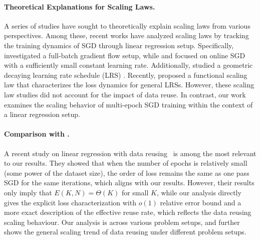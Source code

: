 \paragraph{Theoretical Explanations for Scaling Laws.} A series of studies \citep{sharma2020neuralscalinglawdimension,hutter2021learning,maloney2022solvable,wei2022more,jain2024scalinglawslearningreal,michaud2024quantization,nam2024exactly,atanasov2024scaling,dohmatob2024tale,bahri2024explaining,bordelon2024dynamical,lin2024scaling,paquette202543phasescomputeoptimalneural,bordelon2024feature,zhang2024does,ferbach2025dimension,li2025fsl} have sought to theoretically explain scaling laws from various perspectives. Among these, recent works \citep{bordelon2024dynamical,paquette202543phasescomputeoptimalneural,lin2024scaling,bordelon2024feature} have analyzed scaling laws by tracking the training dynamics of SGD through linear regression setup. Specifically, \citet{bordelon2024dynamical} investigated a full-batch gradient flow setup, while \citet{paquette202543phasescomputeoptimalneural} and \citet{bordelon2024feature} focused on online SGD with a sufficiently small constant learning rate. Additionally, \citet{lin2024scaling} studied a geometric decaying learning rate schedule (LRS) \citep{ge2019step,wu2022iterateriskboundssgd}. Recently, \citet{li2025fsl} proposed a functional scaling law that characterizes the loss dynamics for general LRSs. However, these scaling law studies did not account for the impact of data reuse. In contrast, our work examines the scaling behavior of multi-epoch SGD training within the context of a linear regression setup. 

\paragraph{Comparison with \citet{lin2025improved}.} A recent study on linear regression with data reusing~\citep{lin2025improved} is among the most relevant to our results. They showed that when the number of epochs is relatively small (some power of the dataset size), the order of loss remains the same as one pass SGD for the same iterations, which aligns with our results. However, their results only imply that $E(K,N) = \Theta(K)$ for small $K$, while our analysis directly gives the explicit loss characterization with $o(1)$ relative error bound and a more exact description of the effective reuse rate, which reflects the data reusing scaling behaviour. Our analysis is across various problem setups, and further shows the general scaling trend of data reusing under different problem setups.

